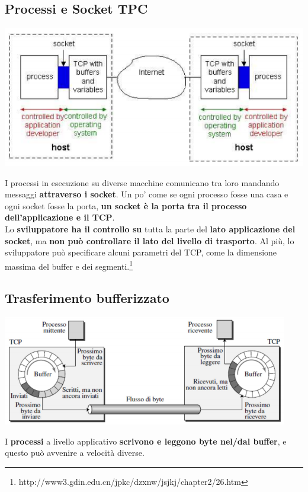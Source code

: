 \documentclass[10pt]{article}
\begin{document}
\subsection{Processi e Socket TPC}
\begin{center}
\includegraphics[scale=1]{procsockettcp.png}
\end{center}
I processi in esecuzione su diverse macchine comunicano tra loro mandando messaggi \textbf{attraverso i socket}. Un po' come se ogni processo fosse una casa e ogni socket fosse la porta, \textbf{un socket è la porta tra il processo dell'applicazione e il TCP}.\\
Lo \textbf{sviluppatore ha il controllo su} tutta la parte del \textbf{lato applicazione del socket}, ma \textbf{non può controllare il lato del livello di trasporto}. Al più, lo sviluppatore può specificare alcuni parametri del TCP, come la dimensione massima del buffer e dei segmenti.\footnote{http://www3.gdin.edu.cn/jpkc/dzxnw/jsjkj/chapter2/26.htm}
\subsection{Trasferimento bufferizzato}
\begin{center}
\includegraphics[scale=1]{trasfbufftcp.png}
\end{center}
I \textbf{processi} a livello applicativo \textbf{scrivono e leggono byte nel/dal buffer}, e questo può avvenire a velocità diverse.
\end{document}
